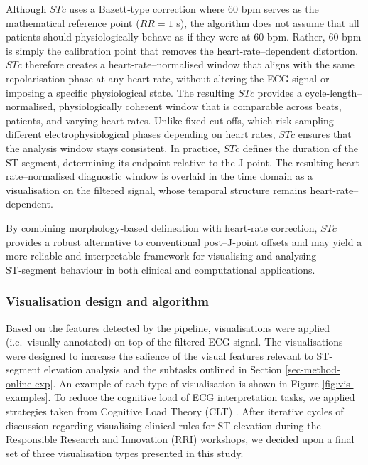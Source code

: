 \documentclass[
  10pt,
  letterpaper,
]{article}
\begin{document}
Although \(STc\) uses a Bazett‑type correction where 60 bpm serves as
the mathematical reference point (\(RR = 1\) s), the algorithm does not
assume that all patients should physiologically behave as if they were
at 60 bpm. Rather, 60 bpm is simply the calibration point that removes
the heart‑rate--dependent distortion. \(STc\) therefore creates a
heart‑rate--normalised window that aligns with the same repolarisation
phase at any heart rate, without altering the ECG signal or imposing a
specific physiological state. The resulting \(STc\) provides a
cycle-length--normalised, physiologically coherent window that is
comparable across beats, patients, and varying heart rates. Unlike fixed
cut-offs, which risk sampling different electrophysiological phases
depending on heart rates, \(STc\) ensures that the analysis window stays
consistent. In practice, \(STc\) defines the duration of the ST-segment,
determining its endpoint relative to the J-point. The resulting
heart-rate--normalised diagnostic window is overlaid in the time domain
as a visualisation on the filtered signal, whose temporal structure
remains heart-rate--dependent.

By combining morphology‑based delineation with heart‑rate correction,
\(STc\) provides a robust alternative to conventional post--J‑point
offsets and may yield a more reliable and interpretable framework for
visualising and analysing ST‑segment behaviour in both clinical and
computational applications.

\subsubsection{Visualisation design and algorithm}\label{sec-design-viz}

Based on the features detected by the pipeline, visualisations were
applied (i.e.~visually annotated) on top of the filtered ECG signal. The
visualisations were designed to increase the salience of the visual
features relevant to ST-segment elevation analysis and the subtasks
outlined in Section \ref{sec-method-online-exp}. An example of each type
of visualisation is shown in Figure \ref{fig:vis-examples}. To reduce
the cognitive load of ECG interpretation tasks, we applied strategies
taken from Cognitive Load Theory (CLT) \citep{paas_2020}. After
iterative cycles of discussion regarding visualising clinical rules for
ST-elevation during the Responsible Research and Innovation (RRI)
workshops, we decided upon a final set of three visualisation types
presented in this study.
\end{document}
